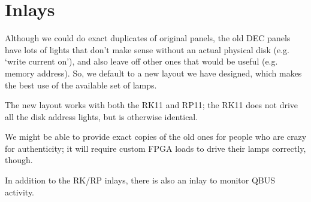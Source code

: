 \section{Inlays}

Although we could do exact duplicates of original panels, the old DEC panels
have lots of lights that don't make sense without an actual physical disk
(e.g. `write current on'), and also leave off other ones that would be useful
(e.g. memory address). So, we default to a new layout we have designed, which
makes the best use of the available set of lamps.

The new layout works with both the RK11 and RP11; the RK11 does not drive all
the disk address lights, but is otherwise identical.

We might be able to provide exact copies of the old ones for people who are
crazy for authenticity; it will require custom FPGA loads to drive their
lamps correctly, though.

In addition to the RK/RP inlays, there is also an inlay to monitor QBUS
activity.

